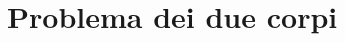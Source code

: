 \documentclass[10pt,a4paper]{book}
\begin{document}
\FloatBarrier







































\section{Problema dei due corpi}
\end{document}
